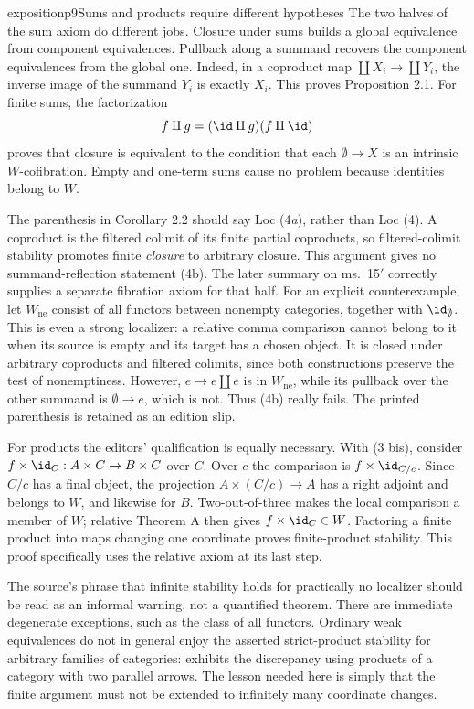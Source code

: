 \begin{dcomment}{exposition}{p9}{Sums and products require different hypotheses}
The two halves of the sum axiom do different jobs. Closure under sums builds a global equivalence from component equivalences. Pullback along a summand recovers the component equivalences from the global one. Indeed, in a coproduct map $\coprod X_i\to\coprod Y_i$, the inverse image of the summand $Y_i$ is exactly $X_i$. This proves Proposition 2.1. For finite sums, the factorization
\[
f\amalg g=(\id\amalg g)(f\amalg\id)
\]
proves that closure is equivalent to the condition that each $\emptyset\to X$ is an intrinsic $W$-cofibration. Empty and one-term sums cause no problem because identities belong to $W$.

The parenthesis in Corollary 2.2 should say Loc (4\emph{a}), rather than Loc (4). A coproduct is the filtered colimit of its finite partial coproducts, so filtered-colimit stability promotes finite \emph{closure} to arbitrary closure. This argument gives no summand-reflection statement (4b). The later summary on ms.~15$'$ correctly supplies a separate fibration axiom for that half. For an explicit counterexample, let $W_{\mathrm{ne}}$ consist of all functors between nonempty categories, together with $\id_\emptyset$. This is even a strong localizer: a relative comma comparison cannot belong to it when its source is empty and its target has a chosen object. It is closed under arbitrary coproducts and filtered colimits, since both constructions preserve the test of nonemptiness. However, $e\to e\amalg e$ is in $W_{\mathrm{ne}}$, while its pullback over the other summand is $\emptyset\to e$, which is not. Thus (4b) really fails. The printed parenthesis is retained as an edition slip.

For products the editors' qualification is equally necessary. With (3 bis), consider $f\times\id_C:A\times C\to B\times C$ over $C$. Over $c$ the comparison is $f\times\id_{C/c}$. Since $C/c$ has a final object, the projection $A\times(C/c)\to A$ has a right adjoint and belongs to $W$, and likewise for $B$. Two-out-of-three makes the local comparison a member of $W$; relative Theorem A then gives $f\times\id_C\in W$. Factoring a finite product into maps changing one coordinate proves finite-product stability. This proof specifically uses the relative axiom at its last step.

The source's phrase that infinite stability holds for practically no localizer should be read as an informal warning, not a quantified theorem. There are immediate degenerate exceptions, such as the class of all functors. Ordinary weak equivalences do not in general enjoy the asserted strict-product stability for arbitrary families of categories: \citet[pp.~306--308]{Thomason1980} exhibits the discrepancy using products of a category with two parallel arrows. The lesson needed here is simply that the finite argument must not be extended to infinitely many coordinate changes.
\end{dcomment}

